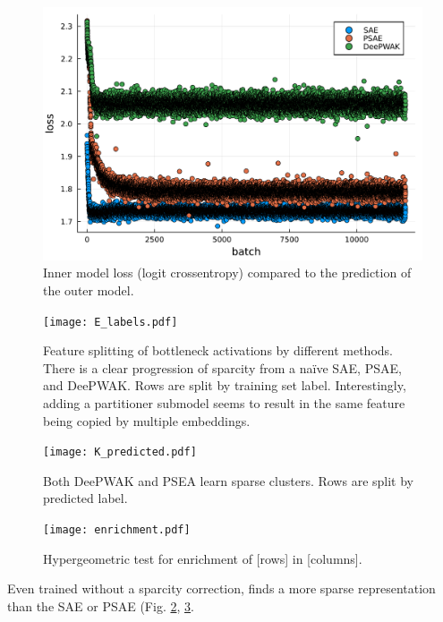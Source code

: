 \begin{figure}{\textwidth}
    \centering
    \includegraphics[width=\textwidth]{fig/loss_inner.pdf}
    \caption{Inner model loss (logit crossentropy) compared to the prediction of the outer model.}
    \label{fig:lossinner}
\end{figure}


\begin{figure}
  \texttt{[image: E\_labels.pdf]}
  \caption{Feature splitting of bottleneck activations by different methods.
    There is a clear progression of sparcity from a na\"ive SAE, PSAE, and DeePWAK.
    Rows are split by training set label.
    Interestingly, adding a partitioner submodel seems to result in the same feature being copied by multiple embeddings.}
    \label{fig:E_MNIST}
\end{figure}

\begin{figure}
  \texttt{[image: K\_predicted.pdf]}
    \caption{Both DeePWAK and PSEA learn sparse clusters. Rows are split by predicted label.}
    \label{fig:K_MNIST}
\end{figure}

\begin{figure}
  \texttt{[image: enrichment.pdf]}
    \caption{Hypergeometric test for enrichment of [rows] in [columns].}
    \label{fig:hyperMNIST}
\end{figure}

    
Even trained without a sparcity correction, \DeePWAK finds a more sparse representation than the SAE or PSAE (Fig. \ref{fig:E_MNIST}, \ref{fig:K_MNIST}.

